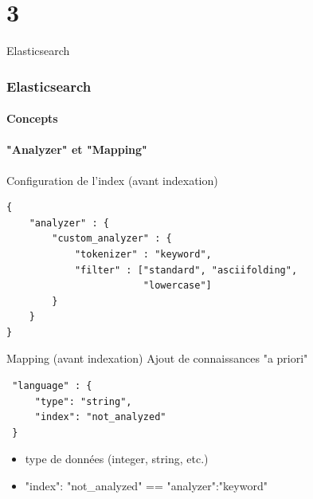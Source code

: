 \documentclass[hangout]{beamer}
\begin{document}
\part{3}
\begin{frame}{Elasticsearch}
	\tableofcontents[part=3]
\end{frame}
\section{Elasticsearch}

\subsection{Concepts}

\subsection{"Analyzer" et "Mapping"}
\begin{frame}[fragile]
	\begin{block}{Configuration de l'index (avant indexation)}
		\begin{lstlisting}
{
    "analyzer" : {
        "custom_analyzer" : {
            "tokenizer" : "keyword",
            "filter" : ["standard", "asciifolding", 
                        "lowercase"]
        }
    }
}
		\end{lstlisting}
	\end{block}
\end{frame}

\begin{frame}[fragile]
	\begin{block}{Mapping (avant indexation)}
		Ajout de connaissances "a priori"
		\begin{lstlisting}
 "language" : {
     "type": "string",
     "index": "not_analyzed"
 }
		\end{lstlisting}
		\begin{itemize}
			\item type de données (integer, string, etc.)
			\item "index": "not\_analyzed" == "analyzer":"keyword"
		\end{itemize}
	\end{block}
\end{frame}
\end{document}
